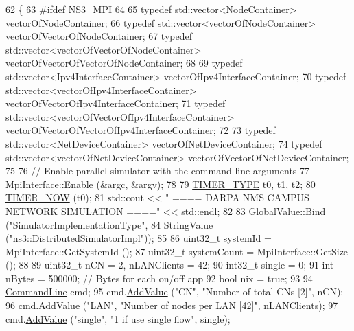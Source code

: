 \begin{DoxyCode}
62 \{
63 \textcolor{preprocessor}{#ifdef NS3\_MPI}
64 
65   \textcolor{keyword}{typedef} std::vector<NodeContainer> vectorOfNodeContainer;
66   \textcolor{keyword}{typedef} std::vector<vectorOfNodeContainer> vectorOfVectorOfNodeContainer;
67   \textcolor{keyword}{typedef} std::vector<vectorOfVectorOfNodeContainer> vectorOfVectorOfVectorOfNodeContainer;  
68 
69   \textcolor{keyword}{typedef} std::vector<Ipv4InterfaceContainer> vectorOfIpv4InterfaceContainer;
70   \textcolor{keyword}{typedef} std::vector<vectorOfIpv4InterfaceContainer> vectorOfVectorOfIpv4InterfaceContainer;
71   \textcolor{keyword}{typedef} std::vector<vectorOfVectorOfIpv4InterfaceContainer> 
      vectorOfVectorOfVectorOfIpv4InterfaceContainer;
72  
73   \textcolor{keyword}{typedef} std::vector<NetDeviceContainer> vectorOfNetDeviceContainer;
74   \textcolor{keyword}{typedef} std::vector<vectorOfNetDeviceContainer> vectorOfVectorOfNetDeviceContainer;
75 
76   \textcolor{comment}{// Enable parallel simulator with the command line arguments}
77   MpiInterface::Enable (&argc, &argv);
78 
79   \hyperlink{nms-p2p-nix-distributed_8cc_adfc7b6dfe70e564fc379bd23c8e5b488}{TIMER\_TYPE} t0, t1, t2;
80   \hyperlink{nms-p2p-nix-distributed_8cc_a4ea1f7c69e863076962d247fee766870}{TIMER\_NOW} (t0);
81   std::cout << \textcolor{stringliteral}{" ==== DARPA NMS CAMPUS NETWORK SIMULATION ===="} << std::endl;
82 
83   GlobalValue::Bind (\textcolor{stringliteral}{"SimulatorImplementationType"},
84                      StringValue (\textcolor{stringliteral}{"ns3::DistributedSimulatorImpl"}));
85 
86   uint32\_t systemId = MpiInterface::GetSystemId ();
87   uint32\_t systemCount = MpiInterface::GetSize ();
88 
89   uint32\_t nCN = 2, nLANClients = 42;
90   int32\_t single = 0;
91   \textcolor{keywordtype}{int} nBytes = 500000; \textcolor{comment}{// Bytes for each on/off app}
92   \textcolor{keywordtype}{bool} nix = \textcolor{keyword}{true};
93 
94   \hyperlink{classns3_1_1CommandLine}{CommandLine} cmd;
95   cmd.\hyperlink{classns3_1_1CommandLine_addcfb546c7ad4c8bd0965654d55beb8e}{AddValue} (\textcolor{stringliteral}{"CN"}, \textcolor{stringliteral}{"Number of total CNs [2]"}, nCN);
96   cmd.\hyperlink{classns3_1_1CommandLine_addcfb546c7ad4c8bd0965654d55beb8e}{AddValue} (\textcolor{stringliteral}{"LAN"}, \textcolor{stringliteral}{"Number of nodes per LAN [42]"}, nLANClients);
97   cmd.\hyperlink{classns3_1_1CommandLine_addcfb546c7ad4c8bd0965654d55beb8e}{AddValue} (\textcolor{stringliteral}{"single"}, \textcolor{stringliteral}{"1 if use single flow"}, single);

\end{DoxyCode}
